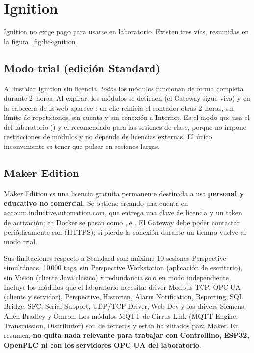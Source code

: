\section{Ignition}
\label{sec:lic-ignition}

Ignition no exige pago para usarse en laboratorio. Existen tres vías, resumidas en la figura~\ref{fig:lic-ignition}.

\subsection{Modo trial (edición Standard)}

Al instalar Ignition sin licencia, \emph{todos} los módulos funcionan de forma completa durante 2~horas. Al expirar, los módulos se detienen (el Gateway sigue vivo) y en la cabecera de la web aparece : un clic reinicia el contador otras 2~horas, sin límite de repeticiones, sin cuenta y sin conexión a Internet. Es el modo que usa el  del laboratorio () y el recomendado para las sesiones de clase, porque no impone restricciones de módulos y no depende de licencias externas. El único inconveniente es tener que pulsar  en sesiones largas.

\subsection{Maker Edition}

Maker Edition es una licencia gratuita permanente destinada a uso \textbf{personal y educativo no comercial}. Se obtiene creando una cuenta en \url{account.inductiveautomation.com}, que entrega una clave de licencia y un token de activación; en Docker se pasan como ,  e . El Gateway debe poder contactar periódicamente con  (HTTPS); si pierde la conexión durante un tiempo vuelve al modo trial.

Sus limitaciones respecto a Standard son: máximo 10 sesiones Perspective simultáneas, 10\,000 tags, sin Perspective Workstation (aplicación de escritorio), sin Vision (cliente Java clásico) y redundancia solo en modo independiente. Incluye los módulos que el laboratorio necesita: driver Modbus TCP, OPC UA (cliente y servidor), Perspective, Historian, Alarm Notification, Reporting, SQL Bridge, SFC, Serial Support, UDP/TCP Driver, Web Dev y los drivers Siemens, Allen-Bradley y Omron. Los módulos MQTT de Cirrus Link (MQTT Engine, Transmission, Distributor) son de terceros y están habilitados para Maker. En resumen, \textbf{no quita nada relevante para trabajar con Controllino, ESP32, OpenPLC ni con los servidores OPC UA del laboratorio}.

